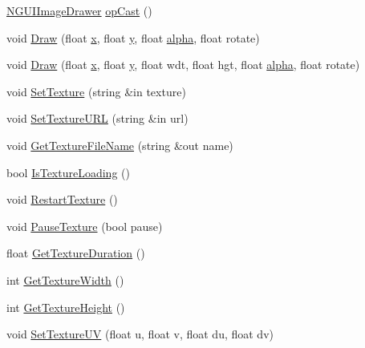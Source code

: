 \begin{DoxyCompactItemize}
\item 
\hyperlink{class_n_g_u_i_image_drawer}{N\+G\+U\+I\+Image\+Drawer} \hyperlink{class_n_g_u_i_image_drawer_a015eb5a3a7018778b870d471e38bd7ad}{op\+Cast} ()
\item 
void \hyperlink{class_n_g_u_i_image_drawer_ab57ab2720311a3a942dd789c17ab64e9}{Draw} (float \hyperlink{class_n_g_u_i_image_drawer_aa45630eba96d13500694a5a1372f8759}{x}, float \hyperlink{class_n_g_u_i_image_drawer_a5848b66155356ddc82e9d3b7f24bb7dc}{y}, float \hyperlink{class_n_g_u_i_image_drawer_adebd64c9cdbcbec73abf154a01b6d5b6}{alpha}, float rotate)
\item 
void \hyperlink{class_n_g_u_i_image_drawer_af9fd91d6b60106153fc4d637f68d1b5f}{Draw} (float \hyperlink{class_n_g_u_i_image_drawer_aa45630eba96d13500694a5a1372f8759}{x}, float \hyperlink{class_n_g_u_i_image_drawer_a5848b66155356ddc82e9d3b7f24bb7dc}{y}, float wdt, float hgt, float \hyperlink{class_n_g_u_i_image_drawer_adebd64c9cdbcbec73abf154a01b6d5b6}{alpha}, float rotate)
\item 
void \hyperlink{class_n_g_u_i_image_drawer_a78257c4b69afba4161f6f92ee1095d51}{Set\+Texture} (string \&in texture)
\item 
void \hyperlink{class_n_g_u_i_image_drawer_ae37358e093d97b45f9e5a6b57851d5a6}{Set\+Texture\+U\+RL} (string \&in url)
\item 
void \hyperlink{class_n_g_u_i_image_drawer_a4a712ec2c705ecf5be02d9a0f067158d}{Get\+Texture\+File\+Name} (string \&out name)
\item 
bool \hyperlink{class_n_g_u_i_image_drawer_aee021c33fcc86d6e60acf0bdaaa70ab6}{Is\+Texture\+Loading} ()
\item 
void \hyperlink{class_n_g_u_i_image_drawer_af2d820dd1f9aeb60f52f95369561dfde}{Restart\+Texture} ()
\item 
void \hyperlink{class_n_g_u_i_image_drawer_a2fe43b02f514f0ec81d2fc06f38c2fda}{Pause\+Texture} (bool pause)
\item 
float \hyperlink{class_n_g_u_i_image_drawer_a1cea5dffb33438c1fab42e00d652f088}{Get\+Texture\+Duration} ()
\item 
int \hyperlink{class_n_g_u_i_image_drawer_aebc034830dd698ca71fdeccc7fd85ff9}{Get\+Texture\+Width} ()
\item 
int \hyperlink{class_n_g_u_i_image_drawer_a97433166c43f695a38f6b69b49734970}{Get\+Texture\+Height} ()
\item 
void \hyperlink{class_n_g_u_i_image_drawer_a00f94706f18c7702eec4d2ec224a3168}{Set\+Texture\+UV} (float u, float v, float du, float dv)
\end{DoxyCompactItemize}
